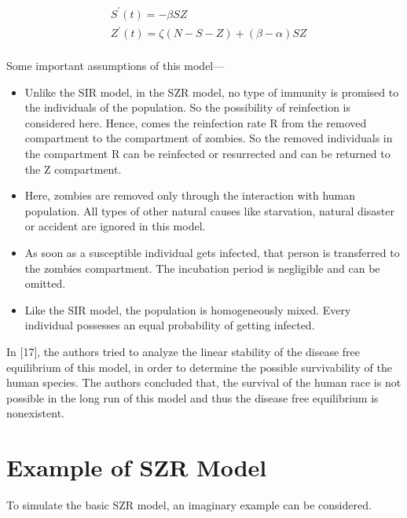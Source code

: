 \begin{equation}
\begin{aligned}
&S^{\prime}(t)=-\beta SZ \\
&Z^{\prime}(t)=\zeta (N - S - Z) + (\beta - \alpha)SZ \\
\end{aligned}
\end{equation}

Some important assumptions of this model--- 

\begin{itemize}
	\item Unlike the SIR model, in the SZR model, no type of immunity is promised to the individuals of the population. So the possibility of reinfection is considered here. Hence, comes the reinfection rate \textzeta R from the removed compartment to the compartment of zombies. So the removed individuals in the compartment R can be reinfected or resurrected and can be returned to the Z compartment. \\
	
	\item Here, zombies are removed only through the interaction with human population. All types of other natural causes like starvation, natural disaster or accident are ignored in this model. \\
	
	\item As soon as a susceptible individual gets infected, that person is transferred to the zombies compartment. The incubation period is negligible and can be omitted. \\
	
	\item Like the SIR model, the population is homogeneously mixed. Every individual possesses an equal probability of getting infected. 
\end{itemize}

In [17], the authors tried to analyze the linear stability of the disease free equilibrium of this model, in order to determine the possible survivability of the human species. The authors concluded that, the survival of the human race is not possible in the long run of this model and thus the disease free equilibrium is nonexistent.

\pagebreak
\section{Example of SZR Model}

To simulate the basic SZR model, an imaginary example can be considered. \\

